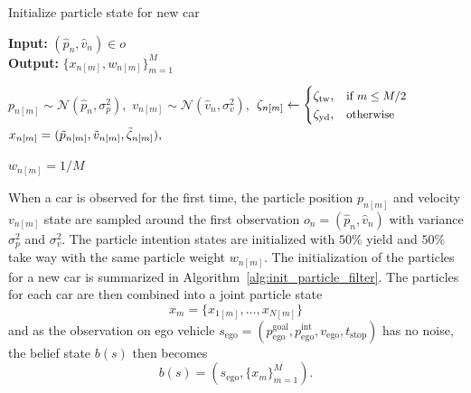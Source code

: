 \begin{algorithm}[!h]
    \caption{Initialize particle state for new car }\label{alg:init_particle_filter}
    \hspace*{\algorithmicindent} \textbf{Input:} $(\hat{p}_{n} , \hat{v}_{n} ) \in o$ \\
    \hspace*{\algorithmicindent} \textbf{Output:} $\{x_{n[m]},w_{n[m]}\}^M_{m=1}$ 
   
    \begin{algorithmic}[1]
        \State $p_{n[m]} \sim \mathcal{N}(\hat{p}_{n}, \sigma_p^2),$
        \State $v_{n[m]} \sim \mathcal{N}(\hat{v}_{n}, \sigma_v^2),$
        \State $\zeta_{n[m]} \gets \begin{cases}
                            \zeta_\mathrm{tw}, & \text{\small if $m \leq M/2$}\\
                            \zeta_\mathrm{yd}, & \text{\small otherwise}
                        \end{cases}$
        \State $x_{n[m]} = (\Tilde{p}_{n[m]}, \Tilde{v}_{n[m]}, \Tilde{\zeta}_{n[m]}),$
        
        \State $w_{n[m]}=1/M$
    \EndFor

    \end{algorithmic}
\end{algorithm}
When a car is observed for the first time, the particle position $p_{n[m]}$ and velocity $v_{n[m]}$ state are sampled around the first observation $o_n = (\hat{p}_{n}, \hat{v}_{n} )$ with variance $\sigma_p^2$ and $\sigma_v^2$. The particle intention states are initialized with $50\%$ yield and $50\%$ take way with the same particle weight $w_{n[m]}$. The initialization of the particles for a new car is summarized in Algorithm~\ref{alg:init_particle_filter}. 
The particles for each car are then combined into a joint particle state 
\begin{equation}
    x_{m} = \{x_{1[m]}, \dots, x_{N[m]}\}
    \label{eq:joint_particles}
\end{equation}
and as the observation on ego vehicle $s_\mathrm{ego}=(p_\mathrm{ego}^\mathrm{goal},p_\mathrm{ego}^\mathrm{int}, v_\mathrm{ego}, t_\mathrm{stop})$ has no noise, the belief state $b(s)$ then becomes 
\begin{equation}
    b(s) = (s_\mathrm{ego}, \{x_m\}^M_{m=1}).
    \label{eq:particle_belief_state}
\end{equation}

